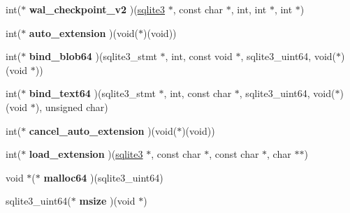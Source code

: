 \begin{DoxyCompactItemize}
\item 
\hypertarget{structsqlite3__api__routines_aff09d36bf959eb60923935f855b7f7b4}{int($\ast$ {\bfseries wal\+\_\+checkpoint\+\_\+v2} )(\hyperlink{structsqlite3}{sqlite3} $\ast$, const char $\ast$, int, int $\ast$, int $\ast$)}\label{structsqlite3__api__routines_aff09d36bf959eb60923935f855b7f7b4}

\item 
\hypertarget{structsqlite3__api__routines_afd7c008f165176aeeea8d6e4e0bfabc0}{int($\ast$ {\bfseries auto\+\_\+extension} )(void($\ast$)(void))}\label{structsqlite3__api__routines_afd7c008f165176aeeea8d6e4e0bfabc0}

\item 
\hypertarget{structsqlite3__api__routines_af7cf21f7a1465dd0c4d6947762998aa2}{int($\ast$ {\bfseries bind\+\_\+blob64} )(sqlite3\+\_\+stmt $\ast$, int, const void $\ast$, sqlite3\+\_\+uint64, void($\ast$)(void $\ast$))}\label{structsqlite3__api__routines_af7cf21f7a1465dd0c4d6947762998aa2}

\item 
\hypertarget{structsqlite3__api__routines_aafda4305000f885aabf0fe18bd86b905}{int($\ast$ {\bfseries bind\+\_\+text64} )(sqlite3\+\_\+stmt $\ast$, int, const char $\ast$, sqlite3\+\_\+uint64, void($\ast$)(void $\ast$), unsigned char)}\label{structsqlite3__api__routines_aafda4305000f885aabf0fe18bd86b905}

\item 
\hypertarget{structsqlite3__api__routines_a33a813156c2973e7b41f4e1d01ec93da}{int($\ast$ {\bfseries cancel\+\_\+auto\+\_\+extension} )(void($\ast$)(void))}\label{structsqlite3__api__routines_a33a813156c2973e7b41f4e1d01ec93da}

\item 
\hypertarget{structsqlite3__api__routines_a88b361b72306cad840dedefeb19edc43}{int($\ast$ {\bfseries load\+\_\+extension} )(\hyperlink{structsqlite3}{sqlite3} $\ast$, const char $\ast$, const char $\ast$, char $\ast$$\ast$)}\label{structsqlite3__api__routines_a88b361b72306cad840dedefeb19edc43}

\item 
\hypertarget{structsqlite3__api__routines_a1a4bbc2fc097764d5860930b7d812213}{void $\ast$($\ast$ {\bfseries malloc64} )(sqlite3\+\_\+uint64)}\label{structsqlite3__api__routines_a1a4bbc2fc097764d5860930b7d812213}

\item 
\hypertarget{structsqlite3__api__routines_a5d3a2ab51526f5ca02c97f9227abbcf3}{sqlite3\+\_\+uint64($\ast$ {\bfseries msize} )(void $\ast$)}\label{structsqlite3__api__routines_a5d3a2ab51526f5ca02c97f9227abbcf3}


\end{DoxyCompactItemize}
